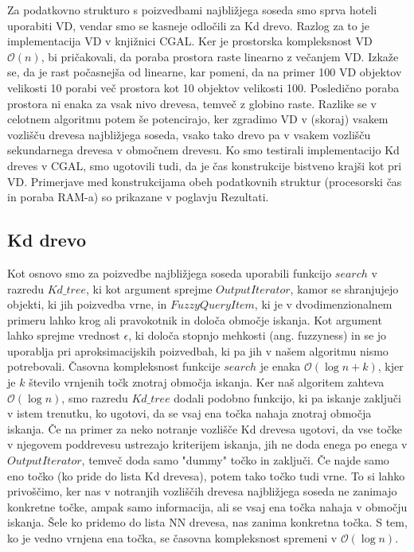 \documentclass[a4paper, 12pt]{book}
\newcommand{\OO}{\ensuremath{\mathcal{O}}} %
\begin{document}
Za podatkovno strukturo s poizvedbami najbližjega soseda smo sprva hoteli uporabiti VD, vendar smo se kasneje odločili za Kd drevo. Razlog za to je implementacija VD v knjižnici CGAL. Ker je prostorska kompleksnost VD $\OO(n)$, bi pričakovali, da poraba prostora raste linearno z večanjem VD. Izkaže se, da je rast počasnejša od linearne, kar pomeni, da na primer 100 VD objektov velikosti 10 porabi več prostora kot 10 objektov velikosti 100. Posledično poraba prostora ni enaka za vsak nivo drevesa, temveč z globino raste. Razlike se v celotnem algoritmu potem še potencirajo, ker zgradimo VD v (skoraj) vsakem vozlišču drevesa najbližjega soseda, vsako tako drevo pa v vsakem vozlišču sekundarnega drevesa v območnem drevesu. Ko smo testirali implementacijo Kd dreves v CGAL, smo ugotovili tudi, da je čas konstrukcije bistveno krajši kot pri VD. Primerjave med konstrukcijama obeh podatkovnih struktur (procesorski čas in poraba RAM-a) so prikazane v poglavju Rezultati.

\subsection{Kd drevo}

Kot osnovo smo za poizvedbe najbližjega soseda uporabili funkcijo $search$ v razredu $Kd{\_}tree$, ki kot argument sprejme $OutputIterator$, kamor se shranjujejo objekti, ki jih poizvedba vrne, in $FuzzyQueryItem$, ki je v dvodimenzionalnem primeru lahko krog ali pravokotnik in določa območje iskanja. Kot argument lahko sprejme vrednost $\epsilon$, ki določa stopnjo mehkosti (ang. fuzzyness) in se jo uporablja pri aproksimacijskih poizvedbah, ki pa jih v našem algoritmu nismo potrebovali. Časovna kompleksnost funkcije $search$ je enaka $\OO(\log n + k)$, kjer je $k$ število vrnjenih točk znotraj območja iskanja. Ker naš algoritem zahteva $\OO(\log n)$, smo razredu $Kd{\_}tree$ dodali podobno funkcijo, ki pa iskanje zaključi v istem trenutku, ko ugotovi, da se vsaj ena točka nahaja znotraj območja iskanja. Če na primer za neko notranje vozlišče Kd drevesa ugotovi, da vse točke v njegovem poddrevesu ustrezajo kriterijem iskanja, jih ne doda enega po enega v $OutputIterator$, temveč doda samo "dummy" točko in zaključi. Če najde samo eno točko (ko pride do lista Kd drevesa), potem tako točko tudi vrne. To si lahko privoščimo, ker nas v notranjih vozliščih drevesa najbližjega soseda ne zanimajo konkretne točke, ampak samo informacija, ali se vsaj ena točka nahaja v območju iskanja. Šele ko pridemo do lista NN drevesa, nas zanima konkretna točka. S tem, ko je vedno vrnjena ena točka, se časovna kompleksnost spremeni v $\OO(\log n)$.
\end{document}
